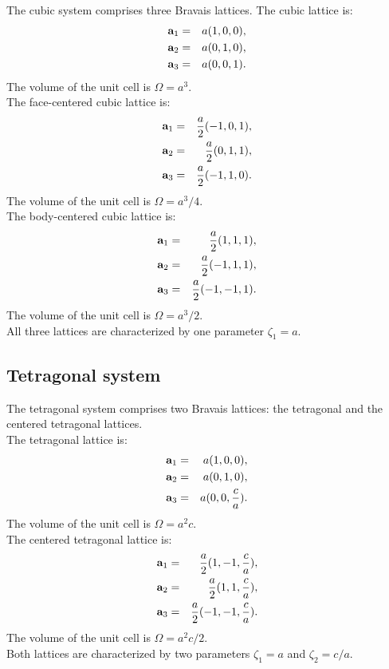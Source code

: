 \documentclass[12pt,a4paper,twoside]{report}
\begin{document}
The cubic system comprises three Bravais lattices. The cubic lattice
is:
\begin{eqnarray}
{\bf a}_1 &=& a (1, 0, 0), \nonumber \\
{\bf a}_2 &=& a (0, 1, 0), \nonumber \\
{\bf a}_3 &=& a (0, 0, 1). \nonumber
\nonumber
\end{eqnarray}
The volume of the unit cell is $\Omega = a^3$. \\
The face-centered cubic lattice is:
\begin{eqnarray}
{\bf a}_1 &=& {a \over 2} (-1, 0, 1), \nonumber \\
{\bf a}_2 &=& {a \over 2} (0, 1, 1), \nonumber \\
{\bf a}_3 &=& {a \over 2} (-1, 1, 0). \nonumber
\nonumber
\end{eqnarray}
The volume of the unit cell is $\Omega = a^3/4$. \\
The body-centered cubic lattice is:
\begin{eqnarray}
{\bf a}_1 &=&{a \over 2} (1, 1, 1), \nonumber \\
{\bf a}_2 &=&{a \over 2} (-1, 1, 1), \nonumber \\
{\bf a}_3 &=&{a \over 2} (-1, -1, 1). \nonumber
\nonumber
\end{eqnarray}
The volume of the unit cell is $\Omega = a^3/2$. \\
All three lattices are characterized by one parameter $\zeta_1=a$.

{\color{web-blue}\subsection{Tetragonal system}}
\color{black}

The tetragonal system comprises two Bravais lattices: the tetragonal
and the centered tetragonal lattices.\\
The tetragonal lattice is:
\begin{eqnarray}
{\bf a}_1 &=& a (1, 0, 0), \nonumber \\
{\bf a}_2 &=& a (0, 1, 0), \nonumber \\
{\bf a}_3 &=& a (0, 0, {c\over a}). \nonumber
\nonumber
\end{eqnarray}
The volume of the unit cell is $\Omega = a^2c$. \\
The centered tetragonal lattice is:
\begin{eqnarray}
{\bf a}_1 &=& {a \over 2} (1, -1, {c\over a}), \nonumber \\
{\bf a}_2 &=& {a \over 2} (1, 1, {c\over a}), \nonumber \\
{\bf a}_3 &=& {a \over 2} (-1, -1, {c\over a}). \nonumber
\nonumber
\end{eqnarray}
The volume of the unit cell is $\Omega = a^2c/2$. \\
Both lattices are characterized by two parameters $\zeta_1=a$ and 
$\zeta_2=c/a$.
\end{document}

